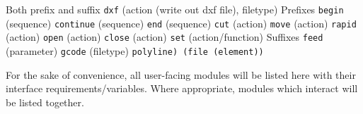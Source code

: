 \documentclass{ltxdoc}
\begin{document}
\begin{outline}
\1 Both prefix and suffix
\2 \texttt{dxf} (action (write out dxf file), filetype)
\1 Prefixes
\2 \texttt{begin} (sequence)
\2 \texttt{continue} (sequence)
\2 \texttt{end} (sequence)
\2 \texttt{cut} (action)
\2 \texttt{move} (action)
\2 \texttt{rapid} (action)
\2 \texttt{open} (action)
\2 \texttt{close} (action)
\2 \texttt{set} (action/function)
\1 Suffixes
\2 \texttt{feed} (parameter)
\2 \texttt{gcode} (filetype)
\2 \texttt{polyline) (file (element))}
\end{outline}


For the sake of convenience, all user-facing modules will be listed here with their interface
requirements/variables. Where appropriate, modules which interact will be listed together.
\end{document}
